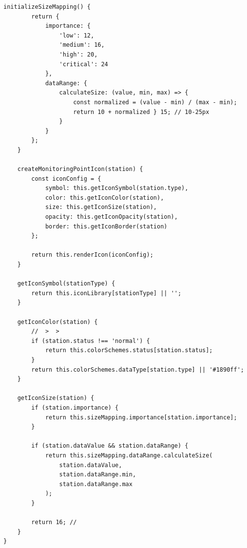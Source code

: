 \begin{lstlisting}[style=javascript]
    initializeSizeMapping() {
        return {
            importance: {
                'low': 12,
                'medium': 16,
                'high': 20,
                'critical': 24
            },
            dataRange: {
                calculateSize: (value, min, max) => {
                    const normalized = (value - min) / (max - min);
                    return 10 + normalized } 15; // 10-25px
                }
            }
        };
    }
    
    createMonitoringPointIcon(station) {
        const iconConfig = {
            symbol: this.getIconSymbol(station.type),
            color: this.getIconColor(station),
            size: this.getIconSize(station),
            opacity: this.getIconOpacity(station),
            border: this.getIconBorder(station)
        };
        
        return this.renderIcon(iconConfig);
    }
    
    getIconSymbol(stationType) {
        return this.iconLibrary[stationType] || '';
    }
    
    getIconColor(station) {
        //  >  > 
        if (station.status !== 'normal') {
            return this.colorSchemes.status[station.status];
        }
        return this.colorSchemes.dataType[station.type] || '#1890ff';
    }
    
    getIconSize(station) {
        if (station.importance) {
            return this.sizeMapping.importance[station.importance];
        }
        
        if (station.dataValue && station.dataRange) {
            return this.sizeMapping.dataRange.calculateSize(
                station.dataValue,
                station.dataRange.min,
                station.dataRange.max
            );
        }
        
        return 16; // 
    }
}
\end{lstlisting}

\hypertarget{section-148}{%
\paragraph{}\label{section-148}}

